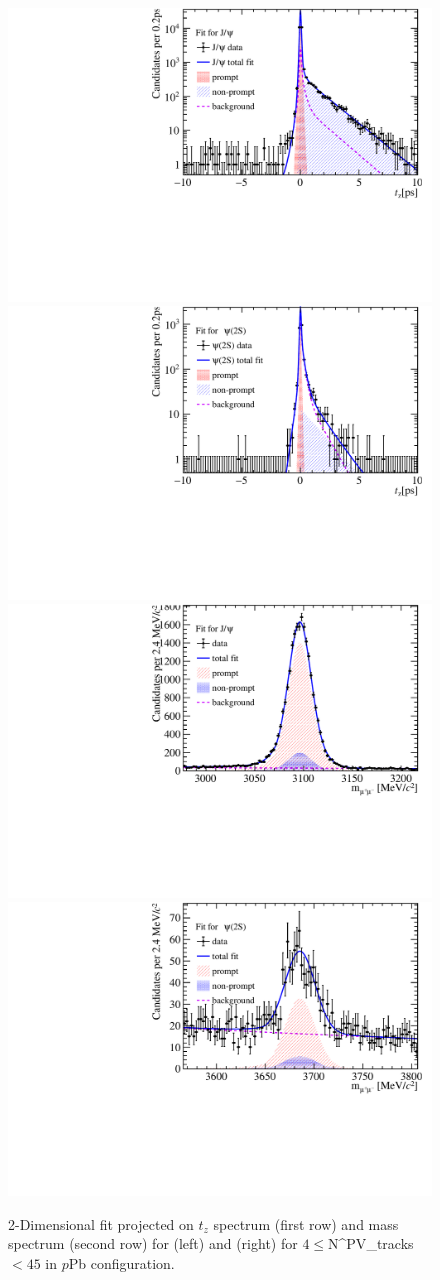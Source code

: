 \begin{figure}[!tbp]
\begin{center}
\includegraphics[width=0.49\linewidth]{pdf/pPb/Workdir/TwoDimFit/ProjTz/Jpsi_n1y1pt1.pdf}
\includegraphics[width=0.49\linewidth]{pdf/pPb/Workdir/TwoDimFit/ProjTz/Psi2S_n1y1pt1.pdf}
\includegraphics[width=0.49\linewidth]{pdf/pPb/Workdir/TwoDimFit/ProjMass/Jpsi_n1y1pt1.pdf}
\includegraphics[width=0.49\linewidth]{pdf/pPb/Workdir/TwoDimFit/ProjMass/Psi2S_n1y1pt1.pdf}
\end{center}
\caption{
	2-Dimensional fit projected on $t_z$ spectrum (first row)  and mass spectrum (second row) for \jpsi (left) and \psitwos (right) for $4\leq $N^{\rm PV}_{\rm tracks}$ < 45$ in $p$Pb configuration.}
\label{fig_2DFit}
\end{figure}
